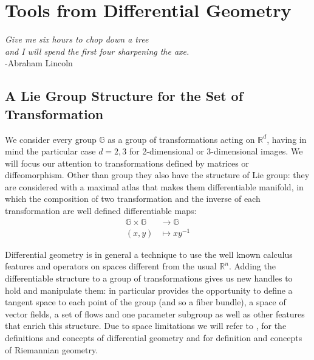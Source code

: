\chapter{Tools from Differential Geometry}\label{ch:tools}

\begin{flushright}
\emph{Give me six hours to chop down a tree\\ and I will spend the first four sharpening the axe.}
\\ -Abraham Lincoln
\end{flushright}

\vspace{0.6cm}

\section{A Lie Group Structure for the Set of Transformation}\label{se:finite_lie_group}

We consider every group $\mathbb{G}$ as a group of transformations acting on $\mathbb{R}^{d}$, having in mind the particular case $d=2,3$ for 2-dimensional or 3-dimensional images.
We will focus our attention to transformations defined by matrices or diffeomorphism. Other than group they also have the structure of Lie group: they are considered with a maximal atlas that makes them differentiable manifold, in which the composition of two transformation and the inverse of each transformation are well defined differentiable maps:
\begin{align*}
\mathbb{G} \times \mathbb{G} & \longrightarrow  \mathbb{G}    \\
(x,y) &\longmapsto  x y^{-1}
\end{align*}

Differential geometry is in general a technique to use the well known calculus features and operators on spaces different from the usual $\mathbb{R}^{n}$. Adding the differentiable structure to a group of transformations gives us new handles to hold and manipulate them: in particular provides the opportunity to define a tangent space to each point of the group (and so a fiber bundle), a space of vector fields, a set of flows and one parameter subgroup as well as other features that enrich this structure.
Due to space limitations we will refer to \cite{do1976differential}, \cite{lee2012introduction} for the definitions and concepts of differential geometry and \cite{do1992riemannian} for definition and concepts of Riemannian geometry.

